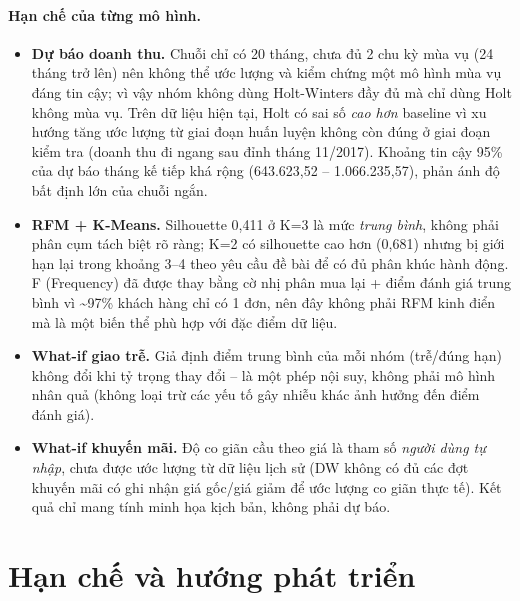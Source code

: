 \documentclass[12pt,a4paper]{article}
\begin{document}
\paragraph{Hạn chế của từng mô hình.}
\begin{itemize}[nosep]
  \item \textbf{Dự báo doanh thu.} Chuỗi chỉ có 20 tháng, chưa đủ 2 chu kỳ mùa vụ (24 tháng trở lên) nên không
        thể ước lượng và kiểm chứng một mô hình mùa vụ đáng tin cậy; vì vậy nhóm không dùng Holt-Winters đầy
        đủ mà chỉ dùng Holt không mùa vụ. Trên dữ liệu hiện tại, Holt có sai số \emph{cao hơn} baseline vì
        xu hướng tăng ước lượng từ giai đoạn huấn luyện không còn đúng ở giai đoạn kiểm tra (doanh thu đi ngang
        sau đỉnh tháng 11/2017). Khoảng tin cậy 95\% của dự báo tháng kế tiếp khá rộng
        (643.623,52 -- 1.066.235,57), phản ánh độ bất định lớn của chuỗi ngắn.
  \item \textbf{RFM + K-Means.} Silhouette 0,411 ở K=3 là mức \emph{trung bình}, không phải phân cụm tách biệt
        rõ ràng; K=2 có silhouette cao hơn (0,681) nhưng bị giới hạn lại trong khoảng 3--4 theo yêu cầu đề bài
        để có đủ phân khúc hành động. F (Frequency) đã được thay bằng cờ nhị phân mua lại + điểm đánh giá
        trung bình vì \textasciitilde 97\% khách hàng chỉ có 1 đơn, nên đây không phải RFM kinh điển mà là một
        biến thể phù hợp với đặc điểm dữ liệu.
  \item \textbf{What-if giao trễ.} Giả định điểm trung bình của mỗi nhóm (trễ/đúng hạn) không đổi khi tỷ trọng
        thay đổi -- là một phép nội suy, không phải mô hình nhân quả (không loại trừ các yếu tố gây nhiễu khác
        ảnh hưởng đến điểm đánh giá).
  \item \textbf{What-if khuyến mãi.} Độ co giãn cầu theo giá là tham số \emph{người dùng tự nhập}, chưa được
        ước lượng từ dữ liệu lịch sử (DW không có đủ các đợt khuyến mãi có ghi nhận giá gốc/giá giảm để ước
        lượng co giãn thực tế). Kết quả chỉ mang tính minh họa kịch bản, không phải dự báo.
\end{itemize}

\section{Hạn chế và hướng phát triển}
\end{document}
